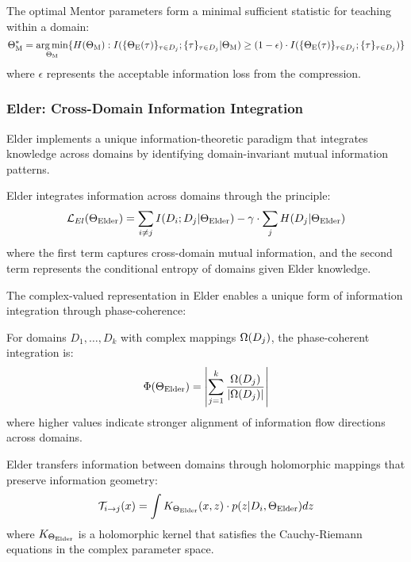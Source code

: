 \begin{proposition}
The optimal Mentor parameters form a minimal sufficient statistic for teaching within a domain:
\begin{equation}
\Theta_{\text{M}}^* = \mathop{\mathrm{arg\,min}}_{\Theta_{\text{M}}} \{ H(\Theta_{\text{M}}) : I(\{\Theta_{\text{E}}(\tau)\}_{\tau \in D_j}; \{\tau\}_{\tau \in D_j} | \Theta_{\text{M}}) \geq (1-\epsilon) \cdot I(\{\Theta_{\text{E}}(\tau)\}_{\tau \in D_j}; \{\tau\}_{\tau \in D_j}) \}
\end{equation}
where $\epsilon$ represents the acceptable information loss from the compression.
\end{proposition}

\subsubsection{Elder: Cross-Domain Information Integration}

Elder implements a unique information-theoretic paradigm that integrates knowledge across domains by identifying domain-invariant mutual information patterns.

\begin{theorem}
Elder integrates information across domains through the principle:
\begin{equation}
\mathcal{L}_{El}(\Theta_{\text{Elder}}) = \sum_{i \neq j} I(D_i; D_j | \Theta_{\text{Elder}}) - \gamma \cdot \sum_j H(D_j | \Theta_{\text{Elder}})
\end{equation}
where the first term captures cross-domain mutual information, and the second term represents the conditional entropy of domains given Elder knowledge.
\end{theorem}

The complex-valued representation in Elder enables a unique form of information integration through phase-coherence:

\begin{definition}
For domains $D_1, \ldots, D_k$ with complex mappings $\Omega(D_j)$, the phase-coherent integration is:
\begin{equation}
\Phi(\Theta_{\text{Elder}}) = \left| \sum_{j=1}^k \frac{\Omega(D_j)}{|\Omega(D_j)|} \right|
\end{equation}
where higher values indicate stronger alignment of information flow directions across domains.
\end{definition}

\begin{theorem}
Elder transfers information between domains through holomorphic mappings that preserve information geometry:
\begin{equation}
\mathcal{T}_{i \to j}(x) = \int K_{\Theta_{\text{Elder}}}(x, z) \cdot p(z | D_i, \Theta_{\text{Elder}}) dz
\end{equation}
where $K_{\Theta_{\text{Elder}}}$ is a holomorphic kernel that satisfies the Cauchy-Riemann equations in the complex parameter space.
\end{theorem}

